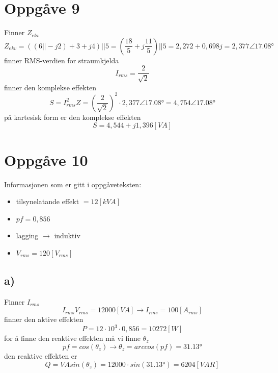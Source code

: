 \documentclass[12pt,a4paper]{article}
\begin{document}
  \section*{Oppgåve 9}
    Finner $Z_{ekv}$
    \begin{equation}
      Z_{ekv} = ((6||-j2)+3+j4)||5 = \left(\frac{18}{5}+j\frac{11}{5} \right) || 5
      = 2,272 + 0,698j = 2,377\angle\ang {17,08}
    \end{equation}
    finner RMS-verdien for straumkjelda
    \begin{equation}
      I_{rms} = \frac{2}{\sqrt{2}}
    \end{equation}
    finner den komplekse effekten
    \begin{equation}
      S = I_{rms}^2Z = \left(\frac{2}{\sqrt{2}}\right)^2 \cdot 2,377\angle\ang{17,08}
      = 4,754 \angle\ang{17,08}
    \end{equation}
    på kartesisk form er den komplekse effekten
    \begin{equation}
      S = 4,544 + j1,396 [VA]
    \end{equation}


  \section*{Oppgåve 10}
    Informasjonen som er gitt i oppgåveteksten:
    \begin{itemize}
      \item tilsynelatande effekt $ = 12[kVA]$
      \item $pf = 0,856$
      \item lagging $\rightarrow$ induktiv
      \item $V_{rms} = 120[V_{rms}]$
    \end{itemize}

    \subsection*{a)}
    Finner $I_{rms}$
    \begin{equation}
      I_{rms}V_{rms} = 12000[VA] \rightarrow I_{rms} = 100[A_{rms}]
    \end{equation}
    finner den aktive effekten
    \begin{equation}
      P = 12\cdot 10^3 \cdot 0,856 = 10272[W]
    \end{equation}
    for å finne den reaktive effekten må vi finne $\theta_z$
    \begin{equation}
      pf = cos(\theta_z) \rightarrow \theta_z = arccos(pf) = \ang{31,13}
    \end{equation}
    den reaktive effekten er
    \begin{equation}
      Q = VAsin(\theta_z) = 12000\cdot sin(\ang{31,13}) = 6204[VAR]
    \end{equation}
\end{document}
